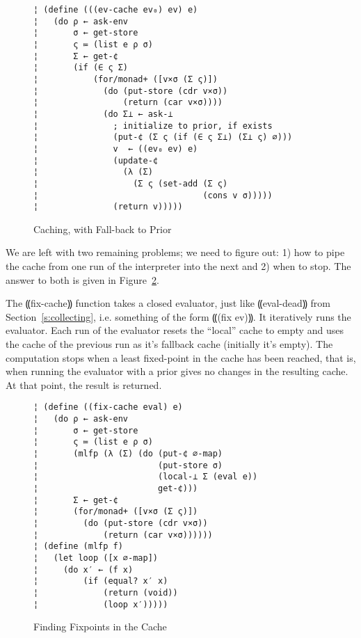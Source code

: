 \begin{figure}
\begin{lstlisting}
¦ (define (((ev-cache ev₀) ev) e)
¦   (do ρ ← ask-env
¦       σ ← get-store
¦       ς ≔ (list e ρ σ)
¦       Σ ← get-¢
¦       (if (∈ ς Σ)
¦           (for/monad+ ([v×σ (Σ ς)])
¦             (do (put-store (cdr v×σ))
¦                 (return (car v×σ))))
¦             (do Σ⊥ ← ask-⊥
¦               ; initialize to prior, if exists
¦               (put-¢ (Σ ς (if (∈ ς Σ⊥) (Σ⊥ ς) ∅)))
¦               v  ← ((ev₀ ev) e)
¦               (update-¢
¦                 (λ (Σ) 
¦                   (Σ ς (set-add (Σ ς)
¦                                 (cons v σ)))))
¦               (return v)))))
\end{lstlisting}
\caption{Caching, with Fall-back to Prior}
\label{f:ev-cache}
\end{figure}

We are left with two remaining problems; we need to figure out: 1) how
to pipe the cache from one run of the interpreter into the next and 2)
when to stop.  The answer to both is given in Figure~\ref{f:cache-fix}.

The ⸨fix-cache⸩ function takes a closed evaluator, just like ⸨eval-dead⸩ from
Section~\ref{s:collecting}, i.e. something of the form ⸨(fix ev)⸩.  It
iteratively runs the evaluator.  Each run of the evaluator resets the ``local''
cache to empty and uses the cache of the previous run as it's fallback cache
(initially it's empty).  The computation stops when a least fixed-point in the
cache has been reached, that is, when running the evaluator with a prior gives
no changes in the resulting cache.  At that point, the result is returned.

\begin{figure}
\begin{lstlisting}
¦ (define ((fix-cache eval) e)  
¦   (do ρ ← ask-env
¦       σ ← get-store
¦       ς ≔ (list e ρ σ)
¦       (mlfp (λ (Σ) (do (put-¢ ∅-map)
¦                        (put-store σ)
¦                        (local-⊥ Σ (eval e))
¦                        get-¢)))
¦       Σ ← get-¢
¦       (for/monad+ ([v×σ (Σ ς)])
¦         (do (put-store (cdr v×σ))
¦             (return (car v×σ))))))
¦ (define (mlfp f)
¦   (let loop ([x ∅-map])
¦     (do x′ ← (f x)
¦         (if (equal? x′ x)
¦             (return (void))
¦             (loop x′)))))
\end{lstlisting}
\caption{Finding Fixpoints in the Cache}
\label{f:cache-fix}
\end{figure}

